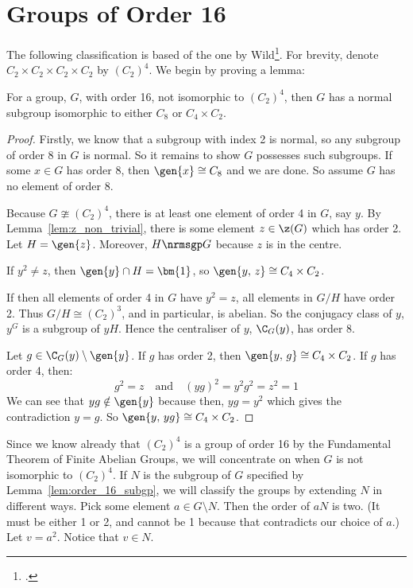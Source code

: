 \section{Groups of Order 16}
The following classification is based of the one by Wild\footcite{order16}.
For brevity, denote \(C_2 \times C_2 \times C_2 \times C_2\) by \({(C_2)}^4\).
We begin by proving a lemma:

\begin{lemma}\label{lem:order_16_subgp}
    For a group, \(G\), with order 16, not isomorphic to \({(C_2)}^4\), then \(G\) has a
    normal subgroup isomorphic to either \(C_8\) or \(C_4 \times C_2\).
\end{lemma}

\begin{proof}
    Firstly, we know that a subgroup with index 2 is normal, so any subgroup of order 8 in \(G\) is normal.
    So it remains to show \(G\) possesses such subgroups.
    If some \(x \in G\) has order 8, then \(\gen{x} \cong C_8\) and we are done.
    So assume \(G\) has no element of order 8.

    Because \(G \ncong {(C_2)}^4\), there is at least one element of order 4 in \(G\), say \(y\).
    By Lemma~\ref{lem:z_non_trivial}, there is some element \(z \in \z(G)\) which has order 2.
    Let \(H = \gen{z}\).
    Moreover, \(H \nrmsgp G\) because \(z\) is in the centre.

    If \(y^2 \neq z\), then \(\gen{y} \cap H = \bm{1}\), so \(\gen{y,\,z} \cong C_4 \times C_2\).

    If then all elements of order 4 in \(G\) have \(y^2 = z\), all elements in \(G/H\) have order 2.
    Thus \(G/H \cong {(C_2)}^3\), and in particular, is abelian.
    So the conjugacy class of \(y\), \(y^G\) is a subgroup of \(yH\).
    Hence the centraliser of \(y\), \(\C_G(y)\), has order 8.

    Let \(g \in \C_G(y) \setminus \gen{y}\).
    If \(g\) has order 2, then \(\gen{y,\,g} \cong C_4 \times C_2\).
    If \(g\) has order 4, then:
    \[g^2 = z \quad \text{and} \quad {(yg)}^2 = y^2 g^2 = z^2 = 1\]
    We can see that \(yg \notin \gen{y}\) because then, \(yg = y^2\) which gives the contradiction \(y = g\).
    So \(\gen{y,\,yg} \cong C_4 \times C_2\).
\end{proof}

Since we know already that \({(C_2)}^4\) is a group of order 16 by the Fundamental Theorem of Finite Abelian Groups, we
will concentrate on when \(G\) is not isomorphic to \({(C_2)}^4\).
If \(N\) is the subgroup of \(G\) specified by Lemma~\ref{lem:order_16_subgp}, we will classify the groups by extending
\(N\) in different ways.
Pick some element \(a \in G \setminus N\).
Then the order of \(aN\) is two.
(It must be either 1 or 2, and cannot be 1 because that contradicts our choice of \(a\).)
Let \(v = a^2\).
Notice that \(v \in N\). %

